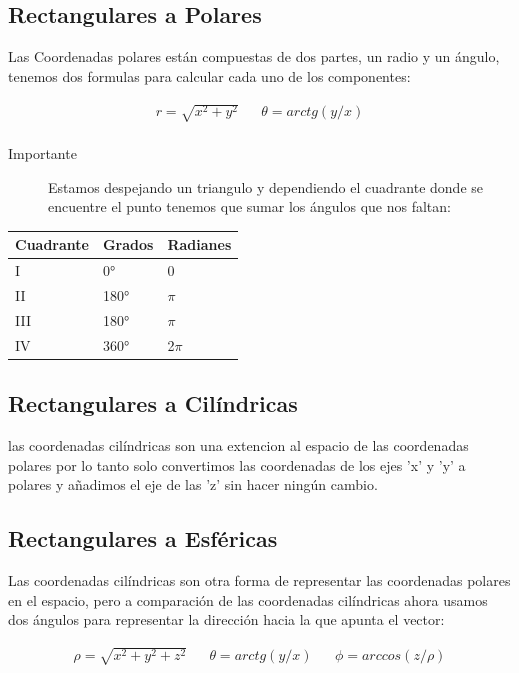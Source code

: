 \documentclass{article}
\begin{document}
\subsection{Rectangulares a Polares}
\label{sec:org71cde31}
Las Coordenadas polares están compuestas de dos partes, un radio y un ángulo, tenemos dos formulas para calcular cada uno de los componentes: 

\[\begin{aligned}
 r = \sqrt{x^2+y^2} && \theta = arctg\left(y/x\right) \\
\end{aligned}\] 

\begin{description}
\item[{Importante}] Estamos despejando un triangulo y dependiendo el cuadrante donde se encuentre el punto tenemos que sumar los ángulos que nos faltan:
\end{description}

\begin{center}
\label{tab:org7551dd1}
\begin{tabular}{lll}
Cuadrante & Grados & Radianes\\
\hline
I & 0° & 0\\
II & 180° & \(\pi\)\\
III & 180° & \(\pi\)\\
IV & 360° & 2\(\pi\)\\
\end{tabular}
\end{center}

\subsection{Rectangulares a Cilíndricas}
\label{sec:orgf42c5d8}
las coordenadas cilíndricas son una extencion al espacio de las coordenadas polares por lo tanto solo convertimos las coordenadas de los ejes 'x' y 'y' a polares y añadimos el eje de las 'z' sin hacer ningún cambio.

\subsection{Rectangulares a Esféricas}
\label{sec:org866f8cf}
Las coordenadas cilíndricas son otra forma de representar las coordenadas polares en el espacio, pero a comparación de las coordenadas cilíndricas ahora usamos dos ángulos para representar la dirección hacia la que apunta el vector: 

\[\begin{aligned}
 \rho = \sqrt{x^2+y^2+z^2} && 
 \theta = arctg\left( y/x \right)  &&
 \phi = arccos\left( z/\rho \right) \\
\end{aligned}\] 
\end{document}

